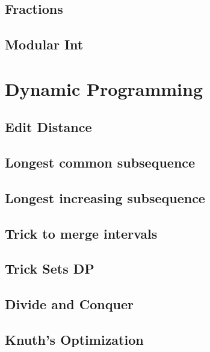 \subsection{Fractions}
\raggedbottom
\hrulefill
\subsection{Modular Int}
\raggedbottom
\hrulefill

\section{Dynamic Programming}
\subsection{Edit Distance}
\raggedbottom
\hrulefill
\subsection{Longest common subsequence}
\raggedbottom
\hrulefill
\subsection{Longest increasing subsequence}
\raggedbottom
\hrulefill
\subsection{Trick to merge intervals}
\raggedbottom
\hrulefill
\subsection{Trick Sets DP}
\raggedbottom
\hrulefill
\subsection{Divide and Conquer}
\raggedbottom
\hrulefill
\subsection{Knuth's Optimization}
\raggedbottom
\hrulefill
